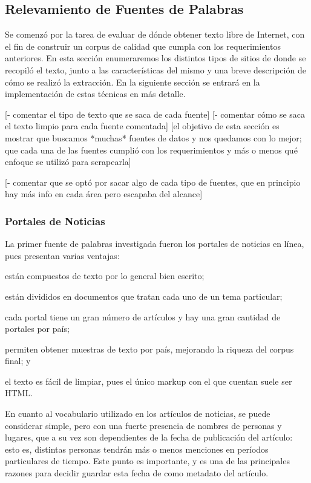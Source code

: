\subsection{Relevamiento de Fuentes de Palabras}

Se comenzó por la tarea de evaluar de dónde obtener texto libre de Internet, con el fin de construir
un corpus de calidad que cumpla con los requerimientos anteriores. En esta sección enumeraremos los
distintos tipos de sitios de donde se recopiló el texto, junto a las características del mismo y una
breve descripción de cómo se realizó la extracción. En la siguiente sección se entrará en la
implementación de estas técnicas en más detalle.

[- comentar el tipo de texto que se saca de cada fuente]
[- comentar cómo se saca el texto limpio para cada fuente comentada]
[el objetivo de esta sección es mostrar que buscamos *muchas* fuentes de datos y nos quedamos con lo
mejor; que cada una de las fuentes cumplió con los requerimientos y más o menos qué enfoque se
utilizó para scrapearla]

[- comentar que se optó por sacar algo de cada tipo de fuentes, que en principio hay más info en cada
área pero escapaba del alcance]


\subsubsection{Portales de Noticias}

La primer fuente de palabras investigada fueron los portales de noticias en línea, pues presentan
varias ventajas:\begin{inparaenum}[(a)]
\item están compuestos de texto por lo general bien escrito;
\item están divididos en documentos que tratan cada uno de un tema particular;
\item cada portal tiene un gran número de artículos y hay una gran cantidad de portales por país;
\item permiten obtener muestras de texto por país, mejorando la riqueza del corpus final; y
\item el texto es fácil de limpiar, pues el único markup con el que cuentan suele ser HTML\@.
\end{inparaenum}

En cuanto al vocabulario utilizado en los artículos de noticias, se puede considerar simple, pero
con una fuerte presencia de nombres de personas y lugares, que a su vez son dependientes de la fecha
de publicación del artículo: esto es, distintas personas tendrán más o menos menciones en períodos
particulares de tiempo. Este punto es importante, y es una de las principales razones para decidir
guardar esta fecha de como metadato del artículo.


